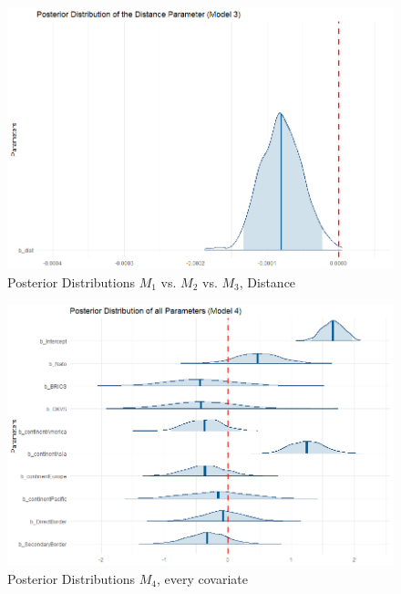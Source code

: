 \documentclass[12pt,a4paper]{article}
\begin{document}
\begin{figure}[h]
\includegraphics[scale=0.2]{PosteriorPlot_Distance_Model3.png}
\caption{Posterior Distributions $M_1$ vs. $M_2$ vs. $M_3$, Distance}
\end{figure}

\begin{figure}[h]
\center
\label{F:6}
\includegraphics[scale=0.4]{PosteriorPlot_Everything_Model4NoDistnace.png}
\caption{Posterior Distributions $M_4$, every covariate}
\end{figure}
\end{document}
